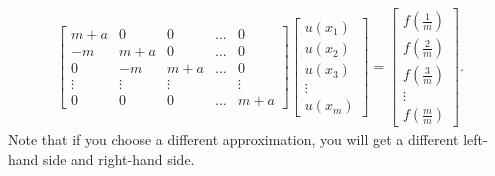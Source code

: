 \documentclass[letterpaper]{article}
\begin{document}
\begin{equation*}
    \begin{aligned}
        \begin{bmatrix}
            m + a & 0 & 0 & \hdots & 0 \\ 
            -m & m + a & 0 & \hdots & 0 \\ 
            0 & -m & m + a & \hdots & 0 \\ 
            \vdots & \vdots & \vdots & & \vdots \\ 
            0 & 0 & 0 & \hdots & m + a
        \end{bmatrix} \begin{bmatrix}
            u(x_1) \\ u(x_2) \\ u(x_3) \\ \vdots \\ u(x_m)
        \end{bmatrix} = \begin{bmatrix}
            f\left(\frac{1}{m}\right) \\ 
            f\left(\frac{2}{m}\right) \\ 
            f\left(\frac{3}{m}\right) \\ 
            \vdots \\ 
            f\left(\frac{m}{m}\right)
        \end{bmatrix}.
    \end{aligned}
\end{equation*}
Note that if you choose a different approximation, you will get a different left-hand side and right-hand side.
\end{document}
